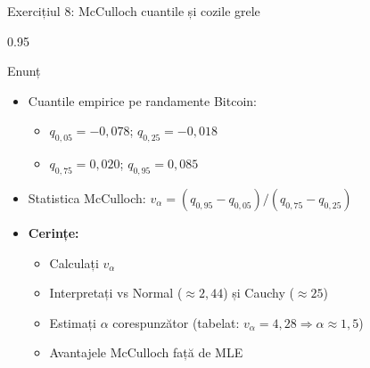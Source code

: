 \documentclass[9pt, aspectratio=169, t]{beamer}
\begin{document}
\begin{frame}[shrink=25]{Exercițiul 8: McCulloch cuantile și cozile grele}
\begin{cminipage}{0.95\textwidth}
\begin{block}{Enunț}
\begin{itemize}\setlength{\itemsep}{0pt}
    \item Cuantile empirice pe randamente Bitcoin:
    \begin{itemize}\setlength{\itemsep}{0pt}
        \item $q_{0{,}05} = -0{,}078$; $q_{0{,}25} = -0{,}018$
        \item $q_{0{,}75} = 0{,}020$; $q_{0{,}95} = 0{,}085$
    \end{itemize}
    \item Statistica McCulloch: $v_\alpha = (q_{0{,}95} - q_{0{,}05})/(q_{0{,}75} - q_{0{,}25})$
    \item \textbf{Cerințe:}
    \begin{itemize}\setlength{\itemsep}{0pt}
        \item Calculați $v_\alpha$
        \item Interpretați vs Normal ($\approx 2{,}44$) și Cauchy ($\approx 25$)
        \item Estimați $\alpha$ corespunzător (tabelat: $v_\alpha = 4{,}28 \Rightarrow \alpha \approx 1{,}5$)
        \item Avantajele McCulloch față de MLE
    \end{itemize}
\end{itemize}
\end{block}
\end{cminipage}
\end{frame}
\end{document}
